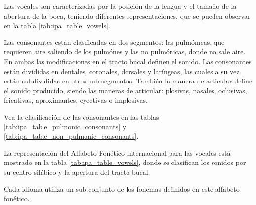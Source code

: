 Las vocales son caracterizadas por la posición de la lengua y el tamaño de la abertura de la boca, teniendo diferentes representaciones, que se pueden observar en la tabla \ref{tab:ipa_table_vowels}. 

Las consonantes están clasificadas en dos segmentos: las pulmónicas, que requieren aire saliendo de los pulmónes y las no pulmónicas, donde no sale aire. En ambas las modificaciones en el tracto bucal definen el sonido. Las consonantes están divididas en dentales, coronales, dorsales y laríngeas, las cuales a su vez están subdivididas en otros sub segmentos. También la manera de articular define el sonido producido, siendo las maneras de articular: plosivas, nasales, oclusivas, fricativas, aproximantes, eyectivas o implosivas.

Vea la clasificación de las consonantes en las tablas \ref{tab:ipa_table_pulmonic_consonants} y \ref{tab:ipa_table_non_pulmonic_consonants}.

La representación del Alfabeto Fonético Internacional para las vocales está mostrado en la tabla \ref{tab:ipa_table_vowels}, donde se clasifican los sonidos por su centro silábico y la apertura del tracto bucal.






Cada idioma utiliza un sub conjunto de los fonemas definidos en este alfabeto fonético.

